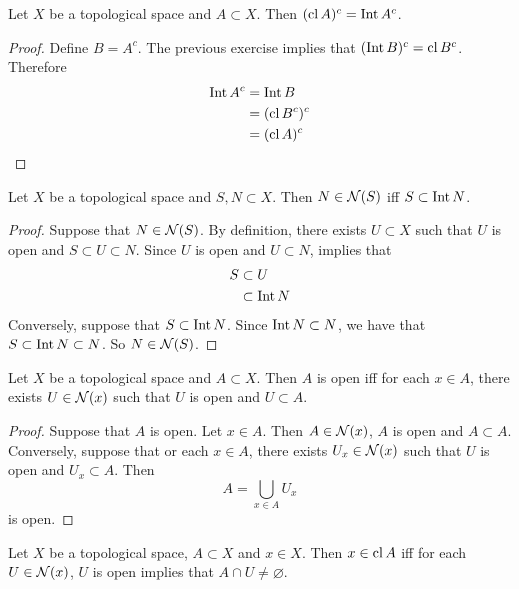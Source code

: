 \documentclass{book}
\begin{document}
	\begin{ex} 
		Let $X$ be a topological space and $A \subset X$. Then $( \operatorname{cl} A )^c = \operatorname{Int} A^c $.
	\end{ex}

	\begin{proof}
		Define $B = A^c$. The previous exercise implies that $( \operatorname{Int} B )^c = \operatorname{cl} B^c $. Therefore 
		\begin{align*}
			\operatorname{Int} A^c 
			& = \operatorname{Int} B \\
			& = ( \operatorname{cl} B^c)^c \\
			& = (\operatorname{cl} A) ^c 
		\end{align*}
	\end{proof}
	
	\begin{ex} 
		Let $X$ be a topological space and $S,N \subset X$. Then $N \in \mathcal{N}(S)$ iff $S \subset \operatorname{Int} N$.
	\end{ex}
	
	\begin{proof}
		Suppose that $N \in \mathcal{N}(S)$. By definition, there exists $U \subset X$ such that $U$ is open and $S \subset U \subset N$. Since $U$ is open and $U \subset N$,  implies that
		\begin{align*}
			S
			& \subset U \\
			& \subset \operatorname{Int} N 
		\end{align*}
		Conversely, suppose that $S \subset \operatorname{Int} N$. Since $\operatorname{Int} N \subset N$, we have that $S \subset \operatorname{Int} N \subset N$. So $N \in \mathcal{N}(S)$.
	\end{proof}
	
	\begin{ex} 
	Let $X$ be a topological space and $A \subset X$. Then $A$ is open iff for each $x \in A$, there exists $U \in \mathcal{N}(x)$ such that $U$ is open and $U \subset A$.
	\end{ex}
	
	\begin{proof}
	Suppose that $A$ is open. Let $x \in A$. Then $A \in \mathcal{N}(x)$, $A$ is open and $A \subset A$. Conversely, suppose that or each $x \in A$, there exists $U_x \in \mathcal{N}(x)$ such that $U$ is open and $U_x \subset A$. Then $$A = \bigcup\limits_{x \in A}U_x$$ is open. 
	\end{proof}

	\begin{ex} 
	Let $X$ be a topological space, $A \subset X$ and $x \in X$. Then $x \in \operatorname{cl} A$ iff for each $U \in \mathcal{N}(x)$, $U$ is open implies that $A \cap U \neq \varnothing$.
	\end{ex}
\end{document}
